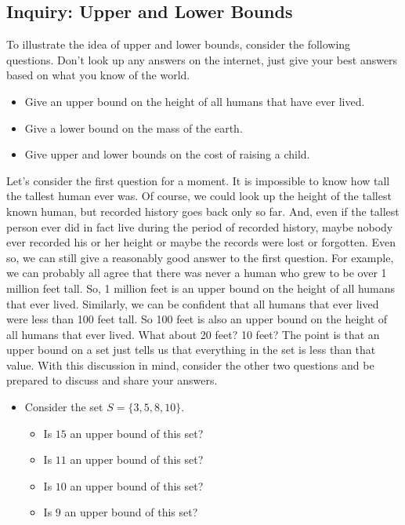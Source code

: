 \documentclass[11pt]{article}
\newenvironment{task}
	{\begin{mdframed}[linecolor=lightgray, linewidth=3pt]\raggedright}
	{\end{mdframed}}
\theoremstyle{definition}
\begin{document}
\subsection{Inquiry: Upper and Lower Bounds}
\begin{task}
  To illustrate the idea of upper and lower bounds, consider the following questions. Don't look up any answers on the internet, just give your best answers
  based on what you know of the world.
  \begin{itemize}
    \item Give an upper bound on the height of all humans that have ever lived.
    \item Give a lower bound on the mass of the earth.
    \item Give upper and lower bounds on the cost of raising a child.
  \end{itemize}
  Let's consider the first question for a moment. It is impossible to know how tall the tallest human ever was. Of course, we could look up the
  height of the tallest known human, but recorded history goes back only so far. And, even if the tallest person ever did in fact live during the
  period of recorded history, maybe nobody ever recorded his or her height or maybe the records were lost or forgotten. Even so, we can still give
  a reasonably good answer to the first question. For example, we can probably all agree that there was never a human who grew to be over 1 million
  feet tall. So, 1 million feet is an upper bound on the height of all humans that ever lived. Similarly, we can be confident that all humans that
  ever lived were less than 100 feet tall. So 100 feet is also an upper bound on the height of all humans that ever lived. What about 20 feet? 10 feet?
  The point is that an upper bound on a set just tells us that everything in the set is less than that value. With this discussion in mind, consider
  the other two questions and be prepared to discuss and share your answers.
  \begin{itemize}
    \item Consider the set $S = \{ 3, 5, 8, 10\}$.
      \begin{itemize}
        \item Is $15$ an upper bound of this set?
        \item Is $11$ an upper bound of this set?
        \item Is $10$ an upper bound of this set?
        \item Is $9$ an upper bound of this set?
      \end{itemize}

\end{itemize}
\end{task}
\end{document}
